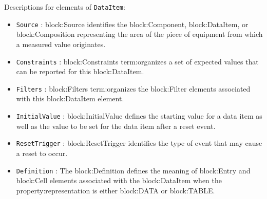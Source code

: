 Descriptions for elements of \texttt{DataItem}:

\begin{itemize}
\item \texttt{Source} : {block:Source} identifies the {block:Component}, {block:DataItem}, or {block:Composition} representing the area of the piece of equipment from which a measured value originates.
\item \texttt{Constraints} : {block:Constraints} {term:organizes} a set of expected values that can be reported for this {block:DataItem}.
\item \texttt{Filters} : {block:Filters} {term:organizes} the {block:Filter} elements associated with this {block:DataItem} element. 
\item \texttt{InitialValue} : {block:InitialValue} defines the starting value for a data item as well as the value to be set for the data item after a reset event.
\item \texttt{ResetTrigger} : {block:ResetTrigger} identifies the type of event that may cause a reset to occur.
\item \texttt{Definition} : The {block:Definition} defines the meaning of {block:Entry} and {block:Cell} elements associated with the {block:DataItem} when the {property:representation} is either {block:DATA} or {block:TABLE}.
\end{itemize}
\FloatBarrier
